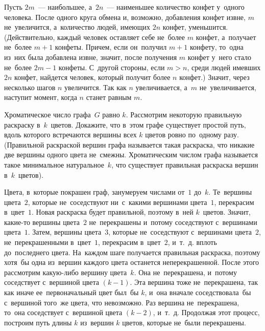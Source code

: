 \ifincludesolutions
Пусть $2 m$~— наибольшее, а~$2 n$~— наименьшее количество
конфет у~одного человека.
После одного круга обмена и, возможно, добавления конфет извне, $m$
не~увеличится, а~количество людей, имеющих $2 n$ конфет, уменьшится.
(Действительно, каждый человек оставляет себе не~более $m$ конфет, а~получает
не~более $m + 1$ конфеты.
Причем, если он~получил $m + 1$ конфету, то~одна из~них была добавлена извне,
значит, после получения $m$ конфет у~него стало не~более $2 m - 1$ конфеты.
С~другой стороны, если $m > n$, среди людей имевших $2 n$ конфет, найдется
человек, который получит более $n$ конфет.)
Значит, через несколько шагов $n$ увеличится.
Так как $n$ увеличивается, а~$m$ не~увеличивается, наступит момент, когда $n$
станет равным $m$.
\fi %

\begin{problems}

\item
Хроматическое число графа~$G$ равно $k$.
Рассмотрим некоторую правильную раскраску в~$k$~цветов.
Докажите, что в~этом графе существует простой путь, вдоль которого встречаются
вершины всех $k$ цветов ровно по~одному разу.
(Правильной раскраской вершин графа называется такая раскраска, что никакие две
вершины одного цвета не~смежны.
Хроматическим числом графа называется такое минимальное натуральное~$k$, что
существует правильная раскраска вершин в~$k$~цветов).

\end{problems}

\ifincludesolutions
Цвета, в~которые покрашен граф, занумеруем числами от~$1$ до~$k$.
Те~вершины цвета~$2$, которые не~соседствуют ни~с~какими вершинами цвета~$1$,
перекрасим в~цвет~$1$.
Новая раскраска будет правильной, поэтому в~ней $k$~цветов.
Значит, какие-то вершины цвета~$2$ не~перекрашены и~потому соседствуют
с~вершинами цвета~$1$.
Затем, вершины цвета~$3$, которые не~соседствуют с~вершинами цвета~$2$,
не~перекрашенными в~цвет~$1$, перекрасим в~цвет~$2$, и~т.~д. вплоть
до~последнего цвета.
На~каждом шаге получается правильная раскраска, поэтому хотя~бы одна из~вершин
каждого цвета останется неперекрашенной.
После этого рассмотрим какую-либо вершину цвета~$k$.
Она не~перекрашена, и~потому соседствует с~вершиной цвета $(k - 1)$.
Эта вершина тоже не~перекрашена, так как иначе ее~первоначальный цвет был~бы
$k$, и~она вначале соседствовала~бы с~вершиной того~же цвета, что невозможно.
Раз вершина не~перекрашена, то~она соседствует с~вершиной цвета $(k - 2)$,
и~т.~д. Продолжая этот процесс, построим путь длины $k$ из~вершин $k$ цветов,
которые не~были перекрашены.
\fi %

